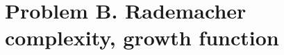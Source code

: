\documentclass[11pt, oneside]{article}   	%
\begin{document}


\newpage
\section{Problem B. Rademacher complexity, growth function}
\end{document}
